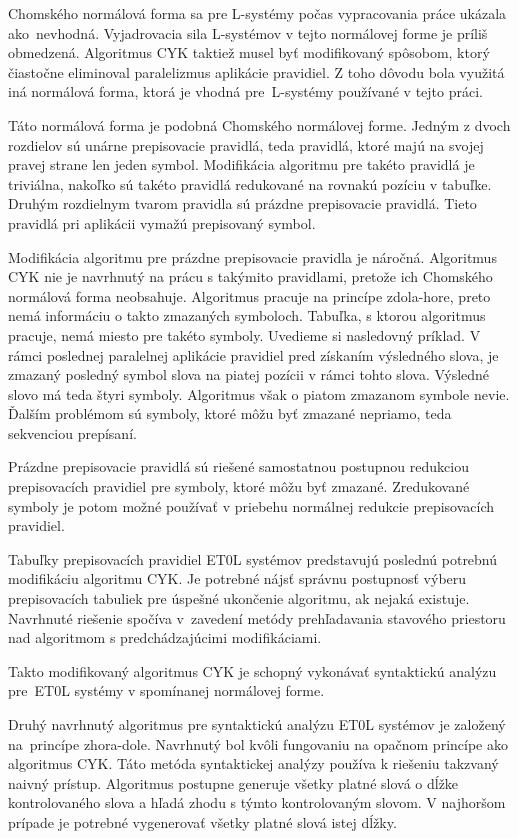 Chomského normálová forma sa pre L-systémy počas vypracovania práce ukázala ako~nevhodná. Vyjadrovacia sila L-systémov v tejto normálovej forme je príliš obmedzená. Algoritmus CYK taktiež musel byť modifikovaný spôsobom, ktorý čiastočne eliminoval paralelizmus aplikácie pravidiel. Z toho dôvodu bola využitá iná normálová forma, ktorá je vhodná pre~L-systémy používané v tejto práci.

Táto normálová forma je podobná Chomského normálovej forme. Jedným z dvoch rozdielov sú unárne prepisovacie pravidlá, teda pravidlá, ktoré majú na svojej pravej strane len jeden symbol. Modifikácia algoritmu pre takéto pravidlá je triviálna, nakoľko sú takéto pravidlá redukované na rovnakú pozíciu v tabuľke. Druhým rozdielnym tvarom pravidla sú prázdne prepisovacie pravidlá. Tieto pravidlá pri aplikácii vymažú prepisovaný symbol.

Modifikácia algoritmu pre prázdne prepisovacie pravidla je náročná. Algoritmus CYK nie je navrhnutý na prácu s takýmito pravidlami, pretože ich Chomského normálová forma neobsahuje. Algoritmus pracuje na princípe zdola-hore, preto nemá informáciu o takto zmazaných symboloch. Tabuľka, s ktorou algoritmus pracuje, nemá miesto pre takéto symboly. Uvedieme si nasledovný príklad. V rámci poslednej paralelnej aplikácie pravidiel pred získaním výsledného slova, je zmazaný posledný symbol slova na piatej pozícii v rámci tohto slova. Výsledné slovo má teda štyri symboly. Algoritmus však o piatom zmazanom symbole nevie. Ďalším problémom sú symboly, ktoré môžu byť zmazané nepriamo, teda sekvenciou prepísaní.

Prázdne prepisovacie pravidlá sú riešené samostatnou postupnou redukciou prepisovacích pravidiel pre symboly, ktoré môžu byť zmazané. Zredukované symboly je potom možné používať v priebehu normálnej redukcie prepisovacích pravidiel.

Tabuľky prepisovacích pravidiel ET0L systémov predstavujú poslednú potrebnú modifikáciu algoritmu CYK. Je potrebné nájsť správnu postupnosť výberu prepisovacích tabuliek pre úspešné ukončenie algoritmu, ak nejaká existuje. Navrhnuté riešenie spočíva v~zavedení metódy prehľadavania stavového priestoru nad algoritmom s predchádzajúcimi modifikáciami.

Takto modifikovaný algoritmus CYK je schopný vykonávať syntaktickú analýzu pre~ET0L systémy v spomínanej normálovej forme.

Druhý navrhnutý algoritmus pre syntaktickú analýzu ET0L systémov je založený na~princípe zhora-dole. Navrhnutý bol kvôli fungovaniu na opačnom princípe ako algoritmus CYK. Táto metóda syntaktickej analýzy používa k riešeniu takzvaný naivný prístup. Algoritmus postupne generuje všetky platné slová o dĺžke kontrolovaného slova a hľadá zhodu s týmto kontrolovaným slovom. V najhoršom prípade je potrebné vygenerovať všetky platné slová istej dĺžky.

